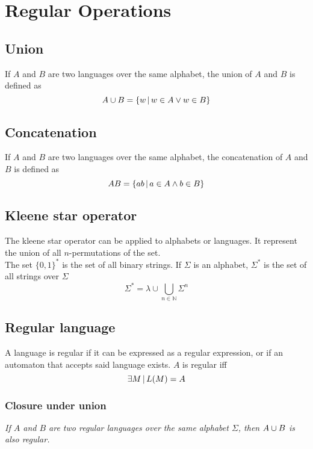 \documentclass{article}
\newcommand{\emptyString}{\lambda}
\begin{document}
\section{Regular Operations}

\subsection{Union}

If \(A\) and \(B\) are two languages over the same alphabet,
the union of \(A\) and \(B\) is defined as
\[
    A \cup B = \{w \,|\, w \in A \lor w \in B\}
\]

\subsection{Concatenation}

If \(A\) and \(B\) are two languages over the same alphabet,
the concatenation of \(A\) and \(B\) is defined as
\[
    AB = \{ab \,|\, a \in A \land b \in B\}
\]

\subsection{Kleene star operator}

The kleene star operator can be applied to alphabets or languages.
It represent the union of all \(n\)-permutations of the set. \\
The set \(\{0,1\}^*\) is the set of
all binary strings. If \(\Sigma\) is an alphabet, \(\Sigma^*\) is the set
of all strings over \(\Sigma\)
\[
    \Sigma^* = \emptyString \cup \bigcup_{n\in\mathbb{N}} \Sigma^n
\]

\subsection{Regular language}

A language is regular if it can be expressed as a regular expression,
or if an automaton that accepts said language exists.
\(A\) is regular iff
\[
    \exists M \,|\, L(M) = A
\]

\subsubsection{Closure under union}

\textit{If \(A\) and \(B\) are two regular languages over the same alphabet
\(\Sigma\), then \(A \cup B\) is also regular.}
\end{document}
